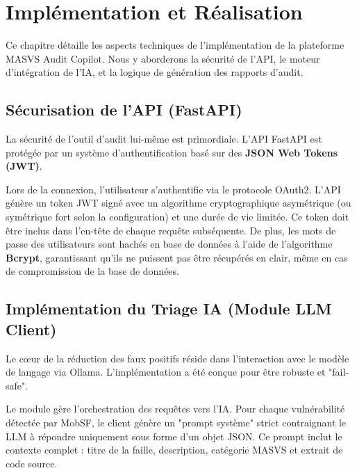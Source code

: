 \chapter{Implémentation et Réalisation}
\label{chap:implementation}

Ce chapitre détaille les aspects techniques de l'implémentation de la plateforme MASVS Audit Copilot. Nous y aborderons la sécurité de l'API, le moteur d'intégration de l'IA, et la logique de génération des rapports d'audit.

\section{Sécurisation de l'API (FastAPI)}
La sécurité de l'outil d'audit lui-même est primordiale. L'API FastAPI est protégée par un système d'authentification basé sur des \textbf{JSON Web Tokens (JWT)}.

Lors de la connexion, l'utilisateur s'authentifie via le protocole OAuth2. L'API génère un token JWT signé avec un algorithme cryptographique asymétrique (ou symétrique fort selon la configuration) et une durée de vie limitée. Ce token doit être inclus dans l'en-tête  de chaque requête subséquente. De plus, les mots de passe des utilisateurs sont hachés en base de données à l'aide de l'algorithme \textbf{Bcrypt}, garantissant qu'ils ne puissent pas être récupérés en clair, même en cas de compromission de la base de données.

\section{Implémentation du Triage IA (Module LLM Client)}
Le cœur de la réduction des faux positifs réside dans l'interaction avec le modèle de langage via Ollama. L'implémentation a été conçue pour être robuste et "fail-safe".

Le module  gère l'orchestration des requêtes vers l'IA. Pour chaque vulnérabilité détectée par MobSF, le client génère un "prompt système" strict contraignant le LLM à répondre uniquement sous forme d'un objet JSON. Ce prompt inclut le contexte complet : titre de la faille, description, catégorie MASVS et extrait de code source.

